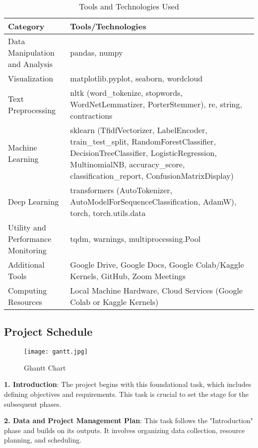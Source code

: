 \documentclass[journal]{IEEEtran}
\begin{document}
\begin{table}[H]
\centering
\begin{tabular}{|p{2cm}|p{5cm}|}
\hline
\textbf{Category} & \textbf{Tools/Technologies} \\ 
\hline
Data Manipulation and Analysis & pandas, numpy \\ 
\hline
Visualization & matplotlib.pyplot, seaborn, wordcloud \\ 
\hline
Text Preprocessing & nltk (word\_tokenize, stopwords, WordNetLemmatizer, PorterStemmer), re, string, contractions \\ 
\hline
Machine Learning & sklearn (TfidfVectorizer, LabelEncoder, train\_test\_split, RandomForestClassifier, DecisionTreeClassifier, LogisticRegression, MultinomialNB, accuracy\_score, classification\_report, ConfusionMatrixDisplay) \\ 
\hline
Deep Learning & transformers (AutoTokenizer, AutoModelForSequenceClassification, AdamW), torch, torch.utils.data \\ 
\hline
Utility and Performance Monitoring & tqdm, warnings, multiprocessing.Pool \\ 
\hline
Additional Tools & Google Drive, Google Docs, Google Colab/Kaggle Kernels, GitHub, Zoom Meetings \\ 
\hline
Computing Resources & Local Machine Hardware, Cloud Services (Google Colab or Kaggle Kernels) \\ 
\hline
\end{tabular}
\caption{Tools and Technologies Used}
\label{table:tools_technologies}
\end{table}

\subsection{\textbf{Project Schedule}}

\begin{figure}[H]
\centering
\texttt{[image: gantt.jpg]}
\caption{Ghantt Chart }
\end{figure}

\textbf{1.  Introduction}: The project begins with this foundational task, which includes defining objectives and requirements. This task is crucial to set the stage for the subsequent phases.

\textbf{2.  Data and Project Management Plan}: This task follows the "Introduction" phase and builds on its outputs. It involves organizing data collection, resource planning, and scheduling.
\end{document}
